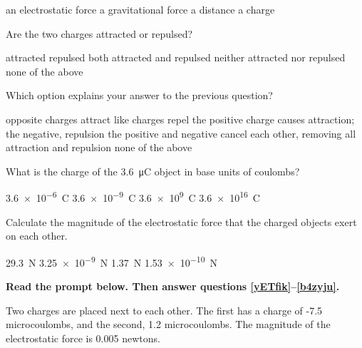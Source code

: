 \documentclass[]{exam}
\begin{document}
\begin{questions}
\begin{randomizechoices}
    \correctchoice an electrostatic force
    \choice a gravitational force
    \choice a distance
    \choice a charge
\end{randomizechoices}

\question
Are the two charges attracted or repulsed?

\begin{randomizechoices}[keeplast]
    \choice attracted
    \correctchoice repulsed
    \choice both attracted and repulsed
    \choice neither attracted nor repulsed
    \choice none of the above
\end{randomizechoices}

\question
Which option explains your answer to the previous question?

\begin{randomizechoices}[keeplast]
    \choice opposite charges attract
    \correctchoice like charges repel
    \choice the positive charge causes attraction; the negative, repulsion
    \choice the positive and negative cancel each other, removing all attraction and repulsion
    \choice none of the above
\end{randomizechoices}

\question
What is the charge of the \SI{3.6}{\micro C} object in base units of coulombs?

\begin{randomizechoices}
    \correctchoice \SI{3.6e-6}{C}
    \choice \SI{3.6e-9}{C}
    \choice \SI{3.6e9}{C}
    \choice \SI{3.6e16}{C}
\end{randomizechoices}

\question \label{Fxl8ta}
Calculate the magnitude of the electrostatic force that the charged objects exert on each other.

\begin{randomizechoices}
    \correctchoice \SI{29.3}{N}
    \choice \SI{3.25e-9}{N}
    \choice \SI{1.37}{N}
    \choice \SI{1.53e-10}{N}
\end{randomizechoices}
\vspace{1em}


\clearpage
\begin{EnvUplevel}
     \textbf{Read the prompt below. Then answer questions \ref{yETfik}--\ref{b4zyju}.}

    Two charges are placed next to each other. The first has a charge of -7.5 microcoulombs, and the second, 1.2 microcoulombs. The magnitude of the electrostatic force is 0.005 newtons.  
\end{EnvUplevel}





\end{questions}
\end{document}
